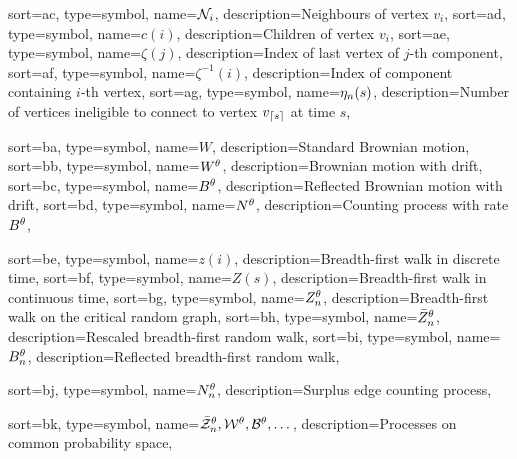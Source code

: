 {
	sort={ac},
	type=symbol,
	name={$\mathcal{N}_{i}$},
	description={Neighbours of vertex $v_i$, \pageref{D: Ni}}
}
{
	sort={ad},
	type=symbol,
	name={$c(i)$},
	description={Children of vertex $v_i$, \pageref{D: ci}}
}
{
	sort={ae},
	type=symbol,
	name={$\zeta(j)$},
	description={Index of last vertex of $j$-th component, \pageref{E: zeta}}
}
{
	sort={af},
	type=symbol,
	name={$\zeta^{-1}(i)$},
	description={Index of component containing $i$-th vertex, \pageref{E: zeta}}
}
{
	sort={ag},
	type=symbol,
	name={$\eta_n(s)$},
	description={Number of vertices ineligible to connect to vertex $v_{\lceil s\rceil}$ at time $s$, \pageref{I: eta}}
}



{
	sort={ba},
	type=symbol,
	name={$W$},
	description={Standard Brownian motion, \pageref{I: bm}}
}
{
	sort={bb},
	type=symbol,
	name={$W^{\theta}$},
	description={Brownian motion with drift, \pageref{D: Wt}}
}
{
	sort={bc},
	type=symbol,
	name={$B^{\theta}$},
	description={Reflected Brownian motion with drift, \pageref{D: Bt}}
}
{
	sort={bd},
	type=symbol,
name={$N^{\theta}$},
description={Counting process with rate $B^{\theta}$, \pageref{I: nt}}
}

{
	sort={be},
	type=symbol,
	name={$z(i)$},
	description={Breadth-first walk in discrete time, \pageref{E: def bf-walk z}}
}
{
	sort={bf},
	type=symbol,
	name={$Z(s)$},
	description={Breadth-first walk in continuous time, \pageref{E: def Z}}
}
{
	sort={bg},
	type=symbol,
	name={$Z_n^{\theta}$},
	description={Breadth-first walk on the critical random graph, \pageref{D: znt}}
}
{
	sort={bh},
	type=symbol,
	name={$\bar{Z}^{\theta}_n$},
	description={Rescaled breadth-first random walk, \pageref{T: Z -> W}}
}
{
	sort={bi},
	type=symbol,
	name={$B_n^{\theta}$},
	description={Reflected breadth-first random walk, \pageref{D: zminz}}
}

{
	sort={bj},
	type=symbol,
name={$N_n^{\theta}$},
description={Surplus edge counting process, \pageref{I: nnt}}
}

{
	sort={bk},
	type=symbol,
name={$\bar{\mathcal{Z}}^{\theta}_n, \mathcal{W}^{\theta}, \mathcal{B}^{\theta}, \dots$},
description={Processes on common probability space, \pageref{I: alt processes}}
}

